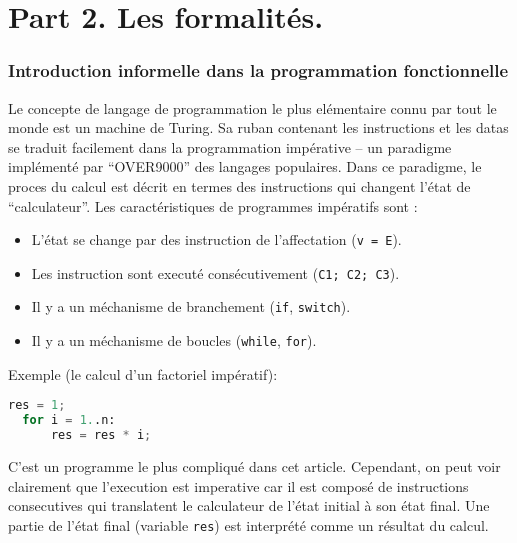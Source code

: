 \documentclass[12pt, a4paper]{article}
\begin{document}
\newpage
\section*{Part 2. Les formalités.}

\subsubsection*{Introduction informelle dans la programmation fonctionnelle}
Le concepte de langage de programmation le plus elémentaire connu par tout le monde est un machine de Turing.
Sa ruban contenant les instructions et les datas se traduit facilement dans la programmation impérative -- un paradigme implémenté par ``OVER9000'' des langages populaires.
Dans ce paradigme, le proces du calcul est décrit en termes des instructions qui changent l'état de ``calculateur''.
Les caractéristiques de programmes impératifs sont :
\begin{itemize}
	\item L'état se change par des instruction de l'affectation (\verb|v = E|).
	\item Les instruction sont executé consécutivement (\verb|C1; C2; C3|).
	\item Il y a un méchanisme de branchement (\verb|if|, \verb|switch|).
	\item Il y a un méchanisme de boucles (\verb|while|, \verb|for|).
\end{itemize}
Exemple (le calcul d'un factoriel impératif):
\begin{lstlisting}[language=Python]
  res = 1;
  for i = 1..n:
      res = res * i;
\end{lstlisting}
C'est un programme le plus compliqué dans cet article.
Cependant, on peut voir clairement que l'execution est imperative car il est composé de instructions consecutives qui translatent le calculateur de l'état initial à son état final.
Une partie de l'état final (variable \verb|res|) est interprété comme un résultat du calcul.
\end{document}
